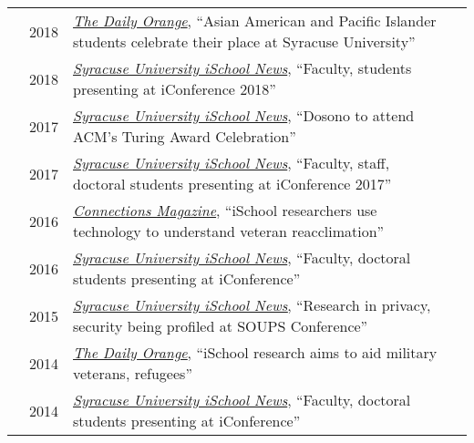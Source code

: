 \documentclass[12pt]{article}
\begin{document}
{{\begin{longtable}{Rp{1.0in}p{0.25in}p{4.75in}}
& \footnotesize{2018} & \href{http://dailyorange.com/2018/04/asian-american-pacific-islander-students-celebrate-place-syracuse-university/}{\textit{{The Daily Orange}}}, ``Asian American and Pacific Islander students celebrate their place at Syracuse University'' \\

& \footnotesize{2018} & \href{https://ischool.syr.edu/articles/news/view/faculty-students-presenting-iconference-2018/}{\textit{{Syracuse University iSchool News}}}, ``Faculty, students presenting at iConference 2018'' \\

& \footnotesize{2017} & \href{https://ischool.syr.edu/articles/news/view/dosono-to-attend-acm-turing-award-celebration/}{\textit{{Syracuse University iSchool News}}}, ``Dosono to attend ACM's Turing Award Celebration'' \\

& \footnotesize{2017} & \href{https://ischool.syr.edu/articles/news/view/faculty-staff-phd-students-presenting-iconference-2017/}{\textit{{Syracuse University iSchool News}}}, ``Faculty, staff, doctoral students presenting at iConference 2017'' \\

& \footnotesize{2016} & \href{https://issuu.com/kiefercreative/docs/suischool-connections-sp2016}{\textit{{Connections Magazine}}}, ``iSchool researchers use technology to understand veteran reacclimation'' \\

& \footnotesize{2016} & \href{https://ischool.syr.edu/articles/news/view/faculty-phd-students-presenting-at-iconference-2016/}{\textit{{Syracuse University iSchool News}}}, ``Faculty, doctoral students presenting at iConference'' \\

& \footnotesize{2015} & \href{https://ischool.syr.edu/articles/news/view/research-in-privacy-security-profiled-at-soups-conference/}{\textit{{Syracuse University iSchool News}},} ``Research in privacy, security being profiled at SOUPS Conference'' \\

& \footnotesize{2014} & \href{http://dailyorange.com/2014/11/ischool-research-aims-to-aid-military-veterans-refugees/}{\textit{{The Daily Orange}},} ``iSchool research aims to aid military veterans, refugees'' \\

& \footnotesize{2014} & \href{https://ischool.syr.edu/articles/news/view/faculty-doctoral-students-presenting-at-iconference/}{\textit{{Syracuse University iSchool News}}}, ``Faculty, doctoral students presenting at iConference'' \\


\end{longtable}}}
\end{document}
